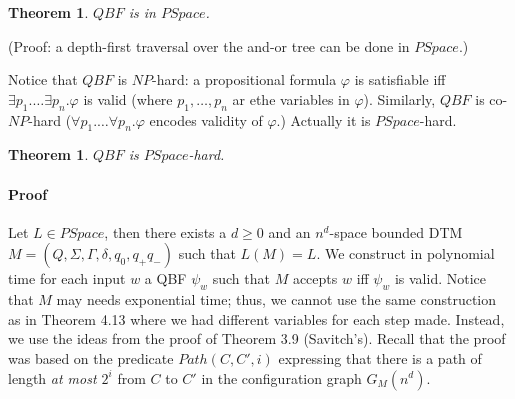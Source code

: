 \documentclass{report}
\newcommand{\NP}{\text{$\mathit{NP}$}\xspace}
\newtheorem{theorem}[definition]{Theorem}
\begin{document}
\begin{theorem} $QBF$ is in $PSpace$.
\end{theorem}
(Proof: a depth-first traversal over the and-or tree can be done in $PSpace$.)

Notice that $QBF$ is $\NP$-hard: a propositional formula $\varphi$ is satisfiable iff $\exists p_1. \ldots \exists p_n.\varphi$ is valid (where $p_1,\ldots, p_n$ ar ethe variables in $\varphi$). Similarly, $QBF$ is co-$NP$-hard ($\forall p_1. \ldots \forall p_n.\varphi$ encodes validity of $\varphi$.) Actually it is $PSpace$-hard. 

\begin{theorem} $QBF$ is $PSpace$-hard.
\end{theorem}

\paragraph{Proof} Let $L \in PSpace$, then there exists a $d \geq 0$ and an $n^d$-space bounded DTM $M = (Q, \Sigma, \Gamma, \delta, q_0, q_+ q_-)$ such that $L(M) = L$. We construct in polynomial time for each input $w$ a QBF $\psi_w$ such that $M$ accepts $w$ iff $\psi_w$ is valid. Notice that $M$ may needs exponential time; thus, we cannot use the same construction as in Theorem 4.13 where we had different variables for each step made. Instead, we use the ideas from the proof of Theorem 3.9 (Savitch's). Recall that the proof was based on the predicate $Path(C,C',i)$ expressing that there is a path of length \emph{at most $2^i$} from $C$ to $C'$ in the configuration graph $G_M(n^d)$. 
\end{document}

